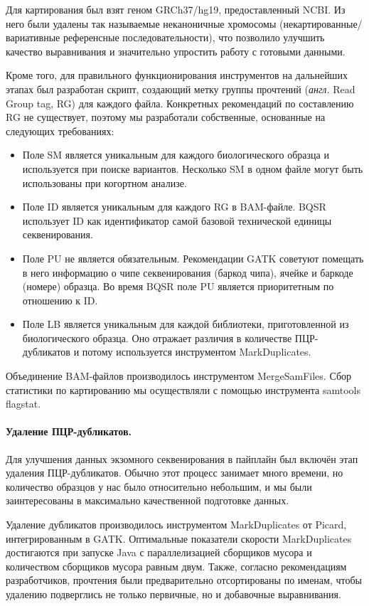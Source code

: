 \documentclass[a4paper,12pt]{article}
\begin{document}
Для картирования был взят геном GRCh37/hg19, предоставленный NCBI.
Из него были удалены так называемые неканоничные хромосомы (некартированные/вариативные референсные последовательности), что позволило улучшить качество выравнивания и значительно упростить работу с готовыми данными.

Кроме того, для правильного функционирования инструментов на дальнейших этапах был разработан скрипт, создающий метку группы прочтений (\textit{англ.} Read Group tag, RG) для каждого файла.
Конкретных рекомендаций по составлению RG не существует, поэтому мы разработали собственные, основанные на следующих требованиях\cite{Auwera_2013}:

\begin{itemize}
\item Поле SM является уникальным для каждого биологического образца и используется при поиске вариантов.
Несколько SM в одном файле могут быть использованы при когортном анализе.
\item Поле ID является уникальным для каждого RG в BAM-файле.
BQSR использует ID как идентификатор самой базовой технической единицы секвенирования.
\item Поле PU не является обязательным.
Рекомендации GATK советуют помещать в него информацию о чипе секвенирования (баркод чипа), ячейке и баркоде (номере) образца.
Во время BQSR поле PU является приоритетным по отношению к ID.
\item Поле LB является уникальным для каждой библиотеки, приготовленной из биологического образца.
Оно отражает различия в количестве ПЦР-дубликатов и потому используется инструментом MarkDuplicates.
\end{itemize}

Объединение BAM-файлов производилось инструментом MergeSamFiles.
Сбор статистики по картированию мы осуществляли с помощью инструмента samtools flagstat\cite{Li_2009_SAMTools}.

\paragraph{Удаление ПЦР-дубликатов.}
Для улучшения данных экзомного секвенирования в пайплайн был включён этап удаления ПЦР-дубликатов.
Обычно этот процесс занимает много времени, но количество образцов у нас было относительно небольшим, и мы были заинтересованы в максимально качественной подготовке данных.

Удаление дубликатов производилось инструментом MarkDuplicates от Picard\cite{PicardTools}, интегрированным в GATK.
Оптимальные показатели скорости MarkDuplicates достигаются при запуске Java с параллелизацией сборщиков мусора и количеством сборщиков мусора равным двум\cite{Heldenbrand_2019}.
Также, согласно рекомендациям разработчиков, прочтения были предварительно отсортированы по именам, чтобы удалению подверглись не только первичные, но и добавочные выравнивания\cite{Auwera_2013}.
\end{document}
